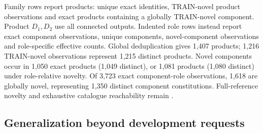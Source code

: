 Family rows report products: unique exact identities, TRAIN-novel product observations and exact products containing a globally TRAIN-novel component. Product $D_1,D_2$ use all connected outputs. Indented role rows instead report exact component observations, unique components, novel-component observations and role-specific effective counts. Global deduplication gives 1,407 products; 1,216 TRAIN-novel observations represent 1,215 distinct products. Novel components occur in 1,050 exact products (1,049 distinct), or 1,081 products (1,080 distinct) under role-relative novelty. Of 3,723 exact component-role observations, 1,618 are globally novel, representing 1,350 distinct component constitutions. Full-reference novelty and exhaustive catalogue reachability remain .
\subsection{Generalization beyond development requests}
\begingroup\scriptsize\setlength{\tabcolsep}{2.5pt}\renewcommand{\arraystretch}{1.1}

